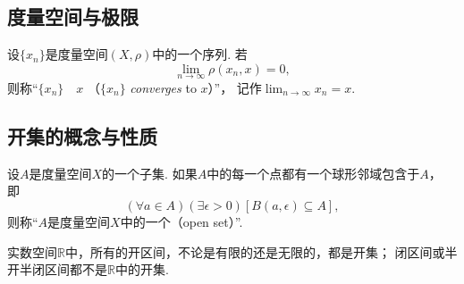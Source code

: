 \subsection{度量空间与极限}
\begin{definition}
设\(\{x_n\}\)是度量空间\((X,\rho)\)中的一个序列.
若\begin{equation*}
	\lim_{n\to\infty} \rho(x_n,x) = 0,
\end{equation*}
则称“\(\{x_n\}\)~~\(x\)%
（\(\{x_n\}\) \emph{converges} to \(x\)）”，
记作\(\lim_{n\to\infty} x_n = x\).
\end{definition}

\subsection{开集的概念与性质}
\begin{definition}\label{definition:度量空间.开集的概念}
设\(A\)是度量空间\(X\)的一个子集.
如果\(A\)中的每一个点都有一个球形邻域包含于\(A\)，
即\begin{equation*}
	(\forall a \in A)
	(\exists\epsilon>0)
	[B(a,\epsilon) \subseteq A],
\end{equation*}
则称“\(A\)是度量空间\(X\)中的一个（open set）”.
\end{definition}

\begin{example}
实数空间\(\mathbb{R}\)中，所有的开区间，不论是有限的还是无限的，都是开集；
闭区间或半开半闭区间都不是\(\mathbb{R}\)中的开集.
\end{example}

